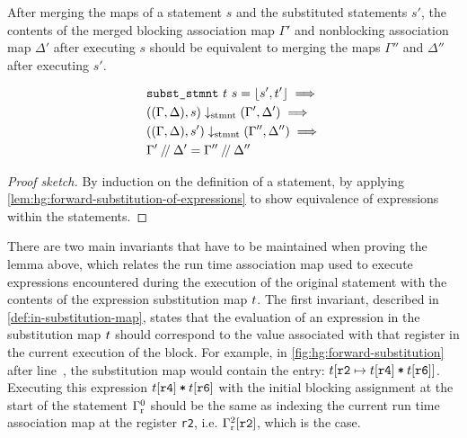 \begin{lemma}%
  \label{lem:hg:equivalence-of-statement-subst}

  After merging the maps of a statement $s$ and the substituted statements $s'$,
  the contents of the merged blocking association map $\Gamma'$ and nonblocking
  association map $\Delta'$ after executing $s$ should be equivalent to merging
  the maps $\Gamma''$ and $\Delta''$ after executing $s'$.

  {\normalfont
    \begin{equation*}
      \begin{aligned}
        &\texttt{subst\_stmnt}\ t\ s = \lfloor s', t' \rfloor\implies\\
        &((\Gamma, \Delta), s) \downarrow_{\text{stmnt}} (\Gamma', \Delta')
          \implies\\
        &((\Gamma, \Delta), s') \downarrow_{\text{stmnt}} (\Gamma'', \Delta'')
          \implies\\
        &\Gamma' \mathbin{/\kern-2pt/} \Delta' = \Gamma'' \mathbin{/\kern-2pt/} \Delta''
      \end{aligned}
    \end{equation*}}

  \begin{proof}[Proof sketch]
    By induction on the definition of a statement, by applying
    \cref{lem:hg:forward-substitution-of-expressions} to show equivalence of
    expressions within the statements.
  \end{proof}
\end{lemma}

There are two main invariants that have to be maintained when proving the lemma
above, which relates the run time association map used to execute expressions
encountered during the execution of the original statement with the contents of
the expression substitution map $t$.  The first invariant, described in
\cref{def:in-substitution-map}, states that the evaluation of an expression in
the substitution map $t$ should correspond to the value associated with
that register in the current execution of the block.  For example, in
\cref{fig:hg:forward-substitution} after line~, the substitution
map would contain the entry:
$t\!\left[\texttt{r2} \mapsto t\!\left[\texttt{r4}\right]
  \mathbin{\texttt{*}} t\!\left[\texttt{r6}\right]\right]$.  Executing this expression
$t\!\left[\texttt{r4}\right] \mathbin{\texttt{*}} t\!\left[\texttt{r6}\right]$
with the initial blocking assignment at the start of the statement
${\Gamma}^{0}_{\mathrm r}$ should be the same as indexing the current
run time association map at the register \texttt{r2},
i.e. ${\Gamma}^{2}_{\mathrm r}\!\left[\texttt{r2}\right]$, which is the case.

